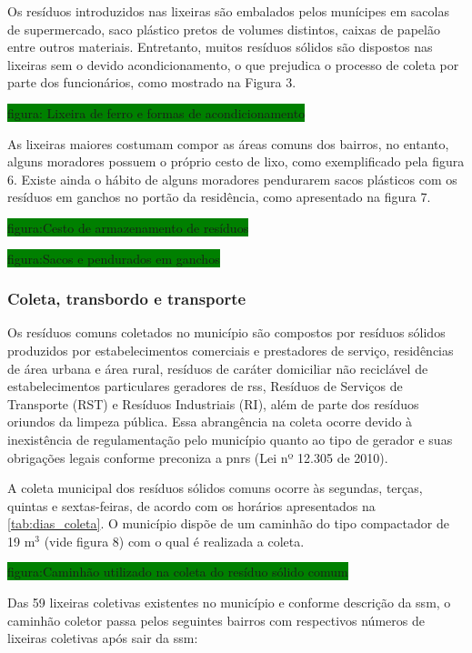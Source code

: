 	Os resíduos introduzidos nas lixeiras são embalados pelos munícipes em sacolas de supermercado, saco plástico pretos de volumes distintos, caixas de papelão entre outros materiais. Entretanto, muitos resíduos sólidos são dispostos nas lixeiras sem o devido acondicionamento, o que prejudica o processo de coleta por parte dos funcionários, como mostrado na Figura 3.
	
	\colorbox{green}{figura: Lixeira de ferro e formas de acondicionamento}
	
	As lixeiras maiores costumam compor as áreas comuns dos bairros, no entanto, alguns moradores possuem o próprio cesto de lixo, como exemplificado pela figura 6. Existe ainda o hábito de alguns moradores pendurarem sacos plásticos com os resíduos em ganchos no portão da residência, como apresentado na figura 7.
	
	\colorbox{green}{figura:Cesto de armazenamento de resíduos}
	
	\colorbox{green}{figura:Sacos e pendurados em ganchos}
	
	\subsubsection{Coleta, transbordo e transporte}
	
	Os resíduos comuns coletados no município são compostos por resíduos sólidos produzidos por estabelecimentos comerciais e prestadores de serviço, residências de área urbana e área rural, resíduos de caráter domiciliar não reciclável de estabelecimentos particulares geradores de \gls{rss}, Resíduos de Serviços de Transporte (RST) e Resíduos Industriais (RI), além de parte dos resíduos oriundos da limpeza pública. Essa abrangência na coleta ocorre devido à inexistência de regulamentação pelo município quanto ao tipo de gerador e suas obrigações legais conforme preconiza a \gls{pnrs} (Lei nº 12.305 de 2010).
	
	A coleta municipal dos resíduos sólidos comuns ocorre às segundas, terças, quintas e sextas-feiras, de acordo com os horários apresentados na \autoref{tab:dias_coleta}.  O município dispõe de um caminhão do tipo compactador de 19 m$^{3}$ (vide figura 8) com o qual é realizada a coleta.
	
	


	\colorbox{green}{figura:Caminhão utilizado na coleta do resíduo sólido comum}
	
	Das 59 lixeiras coletivas existentes no município e conforme descrição da \gls{ssm}, o caminhão coletor passa pelos seguintes bairros com respectivos números de lixeiras coletivas após sair da \gls{ssm}:
	
